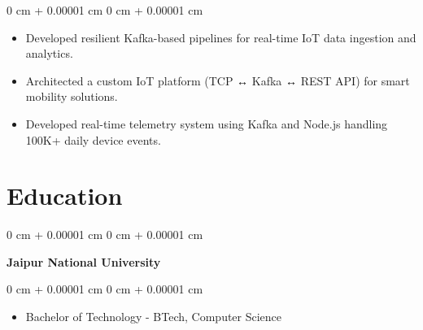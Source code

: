 \documentclass[10pt, letterpaper]{article}
\newenvironment{highlights}{
    \begin{itemize}[
        topsep=0.10 cm,
        parsep=0.10 cm,
        partopsep=0pt,
        itemsep=0pt,
        leftmargin=0 cm + 10pt
    ]
}{
    \end{itemize}
} %
\newenvironment{onecolentry}{
    \begin{adjustwidth}{
        0 cm + 0.00001 cm
    }{
        0 cm + 0.00001 cm
    }
}{
    \end{adjustwidth}
} %
\newenvironment{twocolentry}[2][]{
    \onecolentry
    \def\secondColumn{#2}
    \setcolumnwidth{\fill, 4.5 cm}
    \begin{paracol}{2}
}{
    \switchcolumn \raggedleft \secondColumn
    \end{paracol}
    \endonecolentry
} %
\begin{document}
        \vspace{0.10 cm}
        \begin{onecolentry}
            \begin{highlights}
                \item Developed resilient Kafka-based pipelines for real-time IoT data ingestion and analytics.
                \item Architected a custom IoT platform (TCP ↔ Kafka ↔ REST API) for smart mobility solutions.
                \item Developed real-time telemetry system using Kafka and Node.js handling 100K+ daily device events.
            \end{highlights}
        \end{onecolentry}



    
 \section{Education}



        
        \begin{twocolentry}{
        }
            \textbf{Jaipur National University}\end{twocolentry}

        \vspace{0.10 cm}
        \begin{onecolentry}
            \begin{highlights}
                \item Bachelor of Technology - BTech, Computer Science
            \end{highlights}
        \end{onecolentry}
\end{document}
